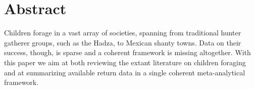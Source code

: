 \section*{Abstract}
Children forage in a vast array of societies, spanning from traditional hunter gatherer groups, such as the Hadza, to Mexican shanty towns. Data on their success, though, is sparse and a coherent framework is missing altogether. With this paper we aim at both reviewing the extant literature on children foraging and at summarizing available return data in a single coherent meta-analytical framework. 






